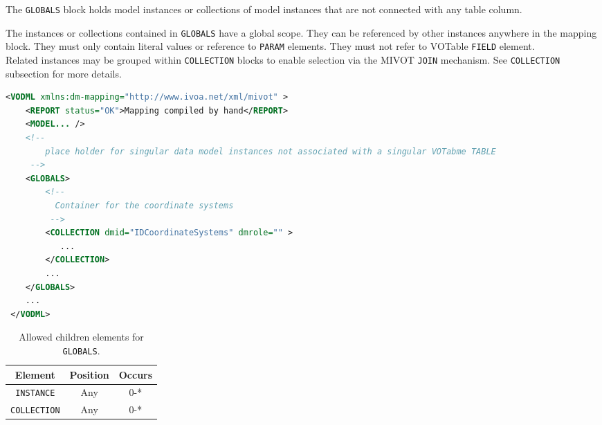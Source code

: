 The \texttt{GLOBALS} block holds model instances or collections of model instances 
that are not connected with any table column. 

The instances or collections contained in \texttt{GLOBALS} have a global scope. They can be
referenced by other instances anywhere in the mapping block.  
They must only contain literal values or reference to \texttt{PARAM} elements.
They must not refer to VOTable \texttt{FIELD} element.  \\ 

Related instances may be grouped within \texttt{COLLECTION} blocks to enable selection
via the MIVOT \texttt{JOIN} mechanism.  
See \texttt{COLLECTION} subsection for more details.

\begin{lstlisting}[caption={Example \texttt{GLOBALS} block (see line~\ref{GLOBALS_snippet} in Appendix~\ref{appendix_A} ) which contains a collection of coordinate systems.},language=XML]
<VODML xmlns:dm-mapping="http://www.ivoa.net/xml/mivot" >
    <REPORT status="OK">Mapping compiled by hand</REPORT>
    <MODEL... />
    <!--	             
        place holder for singular data model instances not associated with a singular VOTabme TABLE
     -->
    <GLOBALS>
        <!--
          Container for the coordinate systems
         -->
        <COLLECTION dmid="IDCoordinateSystems" dmrole="" >
           ...
        </COLLECTION>
        ...
    </GLOBALS>
    ...
 </VODML>
\end{lstlisting}


\begin{table}[!htbp]
  \small
  \centering
  \begin{tabulary}{\linewidth}{|c |c |c|}
    \hline 
        \textbf{Element} &
        \textbf{Position} &
        \textbf{Occurs}\\
    \hline
    \hline
        \texttt{INSTANCE} &
        Any &
        0-*\\
    \hline
        \texttt{COLLECTION} &
        Any &
        0-*\\
    \hline
  \end{tabulary}
  \caption{Allowed children elements for \texttt{GLOBALS}.} 
  \label{tbl:globals-children}
 \end{table}

